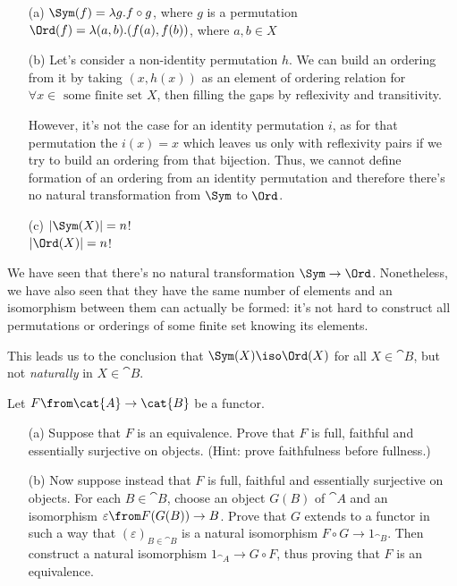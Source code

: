 \begin{answer}
  \begin{itemize}
    \item[(a)]
      $\Sym(f) = \lambda g.f \circ g$, where $g$ is a permutation\\
      $\Ord(f) = \lambda (a, b).(f(a), f(b))$, where $a, b \in X$
    \item[(b)]
      Let's consider a non-identity permutation $h$. We can build an ordering
      from it by taking $(x, h(x))$ as an element of ordering relation for
      $\forall x \in \text{ some finite set } X$, then filling the gaps by
      reflexivity and transitivity.

      However, it's not the case for an identity permutation $i$, as for that
      permutation the $i(x) = x$ which leaves us only with reflexivity pairs if
      we try to build an ordering from that bijection. Thus, we cannot define
      formation of an ordering from an identity permutation and therefore
      there's no natural transformation from $\Sym$ to $\Ord$.
    \item[(c)]
      $|\Sym(X)| = n$!\\
      $|\Ord(X)| = n$!
  \end{itemize}
  We have seen that there's no natural transformation $\Sym \to \Ord$.
  Nonetheless, we have also seen that they have the same number of
  elements and an isomorphism between them can actually be formed: it's not
  hard to construct all permutations or orderings of some finite set knowing
  its elements.

  This leads us to the conclusion that $\Sym(X) \iso \Ord(X)$ for all $X \in
  \cat{B}$, but not \emph{naturally} in $X \in \cat{B}$.
\end{answer}

\begin{exercise}
Let $F\from \cat{A} \to \cat{B}$ be a functor.

        \begin{itemize}
        \item[(a)]
Suppose that $F$ is an equivalence.  Prove that $F$ is full, faithful and
essentially surjective on objects.  (Hint: prove faithfulness before
fullness.)

        \item[(b)]
Now suppose instead that $F$ is full, faithful and essentially surjective
on objects.  For each $B \in \cat{B}$, choose an object $G(B)$ of $\cat{A}$
and an isomorphism $\varepsilon\from F(G(B)) \to B$.  Prove that $G$ extends
to a functor in such a way that $(\varepsilon)_{B \in \cat{B}}$ is a natural
isomorphism $F \circ G \to 1_{\cat{B}}$.  Then construct a natural isomorphism
$1_{\cat{A}} \to G \circ F$, thus proving that $F$ is an equivalence.
        \end{itemize}
\end{exercise}

